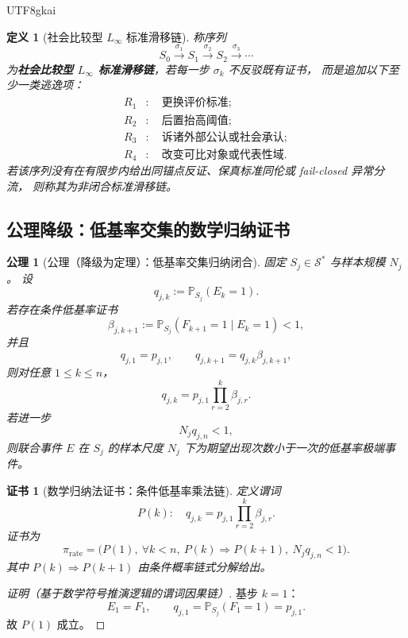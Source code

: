 \documentclass[12pt]{article}
\newtheorem{definition}{定义}[section]
\newtheorem{axiom}{公理}[section]
\newtheorem{Certificate}{证书}[section]
\newcommand{\Linfty}{\ensuremath{L_\infty}}
\begin{document}
\begin{CJK*}{UTF8}{gkai}
\begin{definition}[社会比较型 \(\Linfty\) 标准滑移链]
\label{def:tex51-social-linfty-chain}
称序列
\[
  S_0\xrightarrow{\sigma_1}S_1\xrightarrow{\sigma_2}S_2\xrightarrow{\sigma_3}\cdots
\]
为\textbf{社会比较型 \(\Linfty\) 标准滑移链}，若每一步 \(\sigma_k\) 不反驳既有证书，
而是追加以下至少一类逃逸项：
\[
\begin{aligned}
  R_1&:\quad \text{更换评价标准};\\
  R_2&:\quad \text{后置抬高阈值};\\
  R_3&:\quad \text{诉诸外部公认或社会承认};\\
  R_4&:\quad \text{改变可比对象或代表性域}.
\end{aligned}
\]
若该序列没有在有限步内给出同锚点反证、保真标准同伦或 fail-closed 异常分流，
则称其为非闭合标准滑移链。
\end{definition}

\subsection{公理降级：低基率交集的数学归纳证书}
\label{subsec:tex51-low-rate-induction}

\begin{axiom}[公理（降级为定理）：低基率交集归纳闭合]
\label{ax:tex51-low-rate-intersection}
固定 \(S_j\in\mathcal S^\ast\) 与样本规模 \(N_j\)。
设
\[
  q_{j,k}:=\mathbb P_{S_j}(E_k=1).
\]
若存在条件低基率证书
\[
  \beta_{j,k+1}
  :=
  \mathbb P_{S_j}(F_{k+1}=1\mid E_k=1)<1,
\]
并且
\[
  q_{j,1}=p_{j,1},
  \qquad
  q_{j,k+1}=q_{j,k}\beta_{j,k+1},
\]
则对任意 \(1\le k\le n\)，
\[
  q_{j,k}
  =
  p_{j,1}\prod_{r=2}^{k}\beta_{j,r}.
\]
若进一步
\[
  N_j q_{j,n}<1,
\]
则联合事件 \(E\) 在 \(S_j\) 的样本尺度 \(N_j\) 下为期望出现次数小于一次的低基率极端事件。
\end{axiom}

\begin{Certificate}[数学归纳法证书：条件低基率乘法链]
\label{cert:tex51-low-rate-intersection}
定义谓词
\[
  P(k):\quad
  q_{j,k}=p_{j,1}\prod_{r=2}^{k}\beta_{j,r}.
\]
证书为
\[
  \pi_{\mathrm{rate}}
  =
  \bigl(P(1),\ \forall k<n,\ P(k)\Rightarrow P(k+1),\ N_jq_{j,n}<1\bigr).
\]
其中 \(P(k)\Rightarrow P(k+1)\) 由条件概率链式分解给出。
\end{Certificate}

\begin{proof}[证明（基于数学符号推演逻辑的谓词因果链）]
基步 \(k=1\)：
\[
  E_1=F_1,
  \qquad
  q_{j,1}=\mathbb P_{S_j}(F_1=1)=p_{j,1}.
\]
故 \(P(1)\) 成立。


\end{proof}
\end{CJK*}
\end{document}
